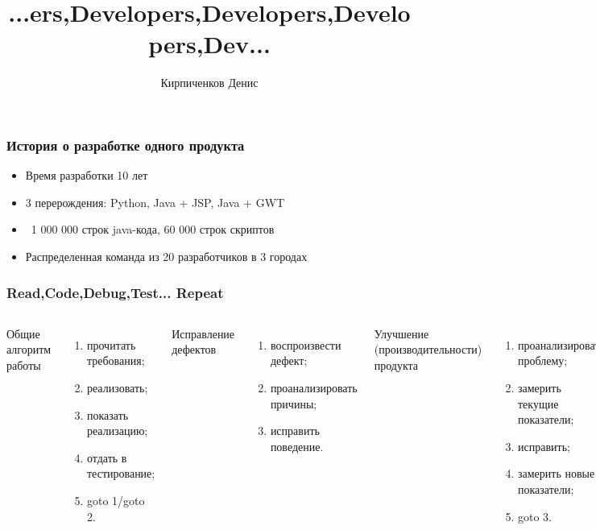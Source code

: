 \documentclass[10pt,pdf,hyperref={unicode}]{beamer}
\date{}
\title[]{...ers,Developers,Developers,Developers,Dev...}
\author[]{Кирпиченков Денис}
\institute[]{Naumen}
\begin{document}
\begin{frame}
\titlepage
\end{frame} 

\begin{frame}
\frametitle{История о разработке одного продукта} 

\begin{itemize}
\item Время разработки 10 лет
\item 3 перерождения: Python, Java + JSP, Java + GWT
\item ~1 000 000 строк java-кода, 60 000 строк скриптов
\item Распределенная команда из 20 разработчиков в 3 городах
\end{itemize}

\end{frame}

\begin{frame}
\frametitle{Read,Code,Debug,Test... Repeat} 

\begin{columns}[T]
		\center
			Общие алгоритм работы
		\begin{enumerate}

			\item прочитать требования;
			\item реализовать;
			\item показать реализацию;
			\item отдать в тестирование;
			\item goto 1/goto 2.
	
		\end{enumerate}
		\center
			Исправление дефектов
		\begin{enumerate}
			\item воспроизвести дефект;
			\item проанализировать причины;
			\item исправить поведение.
		\end{enumerate}
		\center
			Улучшение (производительности) продукта
		\begin{enumerate}
			\item проанализировать проблему;
			\item замерить текущие показатели;
			\item исправить;
			\item замерить новые показатели;
			\item goto 3.
		\end{enumerate}
	\end{columns}
\end{frame}
\end{document}
